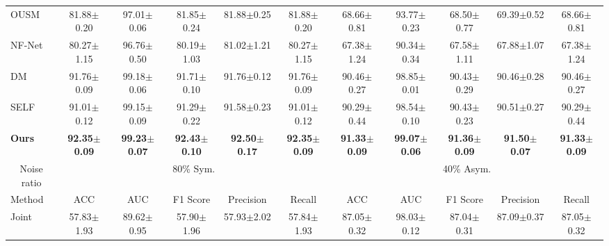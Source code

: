 \begin{table*}[]
\begin{tabular}{@{}lcccccccccc@{}}
OUSM                       & 81.88$\pm$0.20          & 97.01$\pm$0.06          & 81.85$\pm$0.24          & 81.88$\pm$0.25          & 81.88$\pm$0.20          & 68.66$\pm$0.81          & 93.77$\pm$0.23          & 68.50$\pm$0.77          & 69.39$\pm$0.52          & 68.66$\pm$0.81          \\
NF-Net                          & 80.27$\pm$1.15          & 96.76$\pm$0.50          & 80.19$\pm$1.03          & 81.02$\pm$1.21          & 80.27$\pm$1.15          & 67.38$\pm$1.24          & 90.34$\pm$0.34          & 67.58$\pm$1.11          & 67.88$\pm$1.07          & 67.38$\pm$1.24          \\
DM                       & 91.76$\pm$0.09          & 99.18$\pm$0.06          & 91.71$\pm$0.10          & 91.76$\pm$0.12          & 91.76$\pm$0.09          & 90.46$\pm$0.27          & 98.85$\pm$0.01          & 90.43$\pm$0.29          & 90.46$\pm$0.28          & 90.46$\pm$0.27          \\
SELF                            & 91.01$\pm$0.12          & 99.15$\pm$0.09          & 91.29$\pm$0.22          & 91.58$\pm$0.23          & 91.01$\pm$0.12          & 90.29$\pm$0.44          & 98.54$\pm$0.10          & 90.43$\pm$0.23          & 90.51$\pm$0.27          & 90.29$\pm$0.44          \\
\textbf{Ours}                   & \textbf{92.35$\pm$0.09} & \textbf{99.23$\pm$0.07} & \textbf{92.43$\pm$0.10} & \textbf{92.50$\pm$0.17} & \textbf{92.35$\pm$0.09} & \textbf{91.33$\pm$0.09} & \textbf{99.07$\pm$0.06} & \textbf{91.36$\pm$0.09} & \textbf{91.50$\pm$0.07} & \textbf{91.33$\pm$0.09} \\ \midrule
\multicolumn{1}{c}{Noise ratio} & \multicolumn{5}{c}{80\% Sym.}                                                                                    & \multicolumn{5}{c}{40\% Asym.}                                                                                   \\ \midrule
Method                & ACC                  & AUC                  & F1 Score             & {Precision}                  & Recall               & ACC                  & AUC                  & F1 Score             & {Precision}                  & Recall               \\ \midrule
Joint                     & 57.83$\pm$1.93          & 89.62$\pm$0.95          & 57.90$\pm$1.96          & 57.93$\pm$2.02          & 57.84$\pm$1.93          & 87.05$\pm$0.32          & 98.03$\pm$0.12          & 87.04$\pm$0.31          & 87.09$\pm$0.37          & 87.05$\pm$0.32          \\

\end{tabular}
\end{table*}
